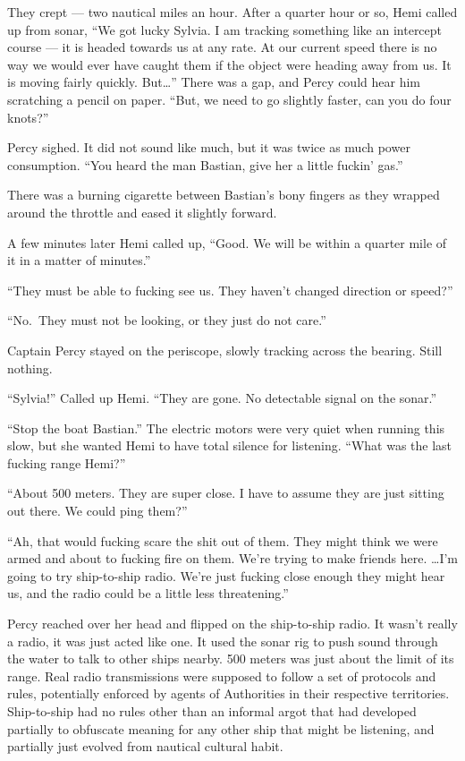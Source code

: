 \documentclass[
]{scrbook}
\begin{document}
They crept --- two nautical miles an hour. After a quarter hour or so,
Hemi called up from sonar, ``We got lucky Sylvia. I am tracking
something like an intercept course --- it is headed towards us at any
rate. At our current speed there is no way we would ever have caught
them if the object were heading away from us. It is moving fairly
quickly. But\ldots{}'' There was a gap, and Percy could hear him
scratching a pencil on paper. ``But, we need to go slightly faster, can
you do four knots?''

Percy sighed. It did not sound like much, but it was twice as much power
consumption. ``You heard the man Bastian, give her a little fuckin'
gas.''

There was a burning cigarette between Bastian's bony fingers as they
wrapped around the throttle and eased it slightly forward.

A few minutes later Hemi called up, ``Good. We will be within a quarter
mile of it in a matter of minutes.''

``They must be able to fucking see us. They haven't changed direction or
speed?''

``No.~They must not be looking, or they just do not care.''

Captain Percy stayed on the periscope, slowly tracking across the
bearing. Still nothing.

``Sylvia!'' Called up Hemi. ``They are gone. No detectable signal on the
sonar.''

``Stop the boat Bastian.'' The electric motors were very quiet when
running this slow, but she wanted Hemi to have total silence for
listening. ``What was the last fucking range Hemi?''

``About 500 meters. They are super close. I have to assume they are just
sitting out there. We could ping them?''

``Ah, that would fucking scare the shit out of them. They might think we
were armed and about to fucking fire on them. We're trying to make
friends here. \ldots I'm going to try ship-to-ship radio. We're just
fucking close enough they might hear us, and the radio could be a little
less threatening.''

Percy reached over her head and flipped on the ship-to-ship radio. It
wasn't really a radio, it was just acted like one. It used the sonar rig
to push sound through the water to talk to other ships nearby. 500
meters was just about the limit of its range. Real radio transmissions
were supposed to follow a set of protocols and rules, potentially
enforced by agents of Authorities in their respective territories.
Ship-to-ship had no rules other than an informal argot that had
developed partially to obfuscate meaning for any other ship that might
be listening, and partially just evolved from nautical cultural habit.
\end{document}
